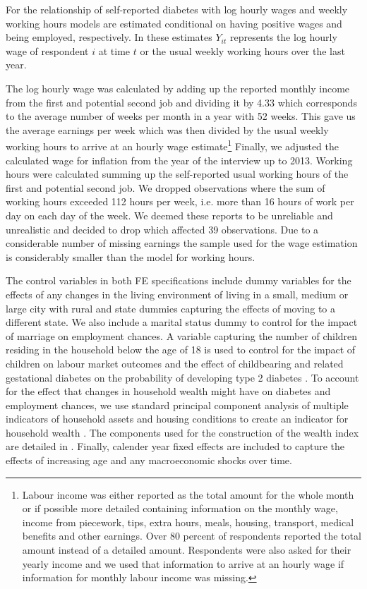 For the relationship of self-reported diabetes with log hourly wages
and weekly working hours models are estimated conditional on having positive wages and being
employed, respectively. In these estimates $Y_{it}$ represents the log hourly wage
of respondent $i$ at time $t$ or the usual weekly working hours
over the last year.

The log hourly wage was calculated by adding up the reported monthly
income from the first and potential second job and dividing it by
4.33 which corresponds to the average number of weeks per month in
a year with 52 weeks. This gave us the average earnings per week which
was then divided by the usual weekly working hours to arrive at an
hourly wage estimate\footnote{Labour income was either reported as the total amount for the whole
month or if possible more detailed containing information on the monthly
wage, income from piecework, tips, extra hours, meals, housing, transport,
medical benefits and other earnings. Over 80 percent of respondents
reported the total amount instead of a detailed amount. Respondents
were also asked for their yearly income and we used that information
to arrive at an hourly wage if information for monthly labour income
was missing.} Finally, we adjusted the calculated wage for inflation from the year
of the interview up to 2013. Working hours were calculated summing
up the self-reported usual working hours of the first and potential
second job. We dropped observations where the sum of working hours
exceeded 112 hours per week, i.e. more than 16 hours of work per day
on each day of the week. We deemed these reports to be unreliable
and unrealistic and decided to drop which affected 39 observations.
Due to a considerable number of missing earnings the sample used for the wage estimation is considerably smaller than the model for working hours.

The control variables in both \ac{FE} specifications include dummy variables for the effects of any changes in the living environment
of living in a small, medium or large city with rural and state
dummies capturing the effects of moving to a different state. We also include a marital
status dummy to control for the impact of marriage on employment chances.
A variable capturing the number of children residing in the household
below the age of 18 is used to control for the impact of children
on labour market outcomes and the effect of childbearing and related
gestational diabetes on the probability of developing type 2 diabetes
\citep{Bellamy2009}. To account for the effect that changes in household
wealth might have on diabetes and employment chances, we use standard
principal component analysis of multiple indicators of household assets
and housing conditions to create an indicator for household wealth
\citep{Filmer2001}. The components used for the construction of the
wealth index are detailed in \citet{Seuring2015}. Finally, calender year fixed effects are included to capture the effects of increasing age and any macroeconomic shocks over time.

